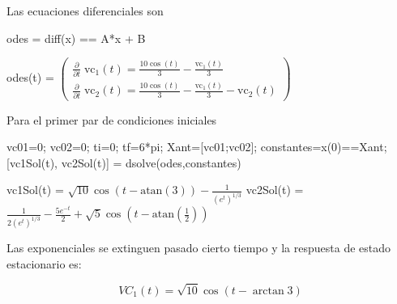 \documentclass[10pt,a4paper]{article} %
\begin{document}
\begin{par}
	\begin{flushleft}
		Las ecuaciones diferenciales son
	\end{flushleft}
\end{par}

\begin{matlabcode}
	odes = diff(x) == A*x + B
\end{matlabcode}
\begin{matlabsymbolicoutput}
	odes(t) = 
	$\displaystyle \left(\begin{array}{c}
	\frac{\partial }{\partial t}\;{\textrm{vc}}_1 \left(t\right)=\frac{10 \cos \left(t\right)}{3}-\frac{{\textrm{vc}}_1 \left(t\right)}{3}\\
	\frac{\partial }{\partial t}\;{\textrm{vc}}_2 \left(t\right)=\frac{10 \cos \left(t\right)}{3}-\frac{{\textrm{vc}}_1 \left(t\right)}{3}-{\textrm{vc}}_2 \left(t\right)
	\end{array}\right)$
\end{matlabsymbolicoutput}


\begin{par}
	\begin{flushleft}
		Para el primer par de condiciones iniciales
	\end{flushleft}
\end{par}

\begin{matlabcode}
	vc01=0;
	vc02=0;
	ti=0;
	tf=6*pi;
	Xant=[vc01;vc02];
	constantes=x(0)==Xant;
	[vc1Sol(t), vc2Sol(t)] = dsolve(odes,constantes)
\end{matlabcode}
\begin{matlabsymbolicoutput}
	vc1Sol(t) = 
	$\displaystyle \sqrt{10} \cos \left(t-\textrm{atan}\left(3\right)\right)-\frac{1}{{{\left(e^t \right)}}^{1/3} }$
	vc2Sol(t) = 
	$\displaystyle \frac{1}{2 {{\left(e^t \right)}}^{1/3} }-\frac{5 e^{-t} }{2}+\sqrt{5} \cos \left(t-\textrm{atan}\left(\frac{1}{2}\right)\right)$
\end{matlabsymbolicoutput}

\begin{par}
	\begin{flushleft}
		Las exponenciales se extinguen pasado cierto tiempo y la respuesta de estado estacionario es:
	\end{flushleft}
\end{par}

\begin{par}
	$$VC_1(t)=\sqrt{10}\cos(t-\arctan{3})$$
\end{par}
\end{document}
